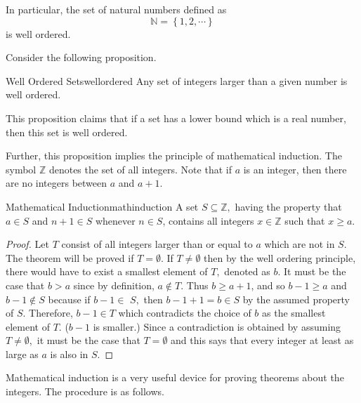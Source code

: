 In particular, the set of natural numbers defined as
\begin{equation*}
\mathbb{N} = \left\{ 1,2,\cdots \right\}
\end{equation*}
is well ordered.

Consider the following proposition.

\begin{proposition}{Well Ordered Sets}{wellordered}
Any set of integers larger than a given number is well ordered.
\end{proposition}

This proposition claims that if a set has a lower bound which is a real number, 
then this set is well ordered.

Further, this proposition implies the principle of mathematical induction. The symbol $\mathbb{Z}$ denotes the set of all
integers. Note that if $a$ is an integer, then there are no integers between
$a$ and $a+1.$

\begin{theorem}{Mathematical Induction}{mathinduction}
 A set $S\subseteq \mathbb{Z},$ having
the property that $a\in S$ and $n+1\in S$ whenever $n\in S$, contains all
integers $x\in \mathbb{Z}$ such that $x\geq a.$
\end{theorem}

\begin{proof} 
Let $T$ consist of all integers larger than or equal to $a$
which are not in $S.$ The theorem will be proved if $T=\emptyset .$ If 
$T\neq \emptyset $ then by the well ordering principle, there would have to
exist a smallest element of $T,$ denoted as $b.$ It must be the case that 
$b>a$ since by definition, $a\notin T.$ Thus $b\geq a+1$, and so $b-1\geq a$
and $b-1\notin S$ because if $b-1\in $ $S,$ then $b-1+1=b\in S$ by the
assumed property of $S.$ Therefore, $b-1\in T$ which contradicts the choice
of $b$ as the smallest element of $T.$ ($b-1$ is smaller.) Since a
contradiction is obtained by assuming $T\neq \emptyset ,$ it must be the
case that $T=\emptyset $ and this says that every integer at least as large
as $a$ is also in $S$.
\end{proof}

Mathematical induction is a very useful device for proving theorems about
the integers. The procedure is as follows.

